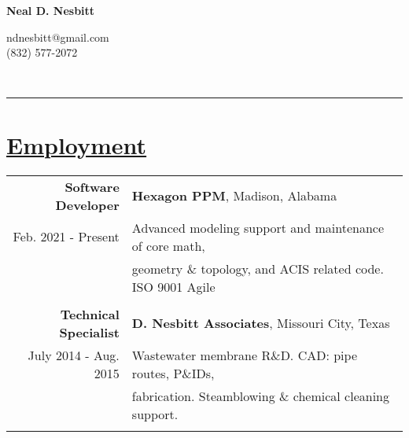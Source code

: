 \documentclass[10pt]{article}   %
\begin{document}
\noindent
\begin{minipage}[l]{0.58\textwidth}
\Huge \bf Neal D. Nesbitt
\end{minipage}
\hfill
\begin{minipage}[r]{0.38\textwidth}
\raggedleft
ndnesbitt@gmail.com\\
(832) 577-2072
\end{minipage}\\

\hrule

\section*{\underline{Employment}}

\begin{tabular}{ r | l }
\bf Software Developer		&\textbf{Hexagon PPM}, Madison, Alabama\\
Feb. 2021 - Present          		&Advanced modeling support and maintenance of core math,\\
					&geometry \& topology, and ACIS related code. ISO 9001 Agile\\
\\
\bf Technical Specialist        &\textbf{D. Nesbitt Associates}, Missouri City, Texas\\
July 2014 - Aug. 2015           &Wastewater membrane R\&D. CAD: pipe routes, P\&IDs,\\
                                &fabrication. Steamblowing \& chemical cleaning support.\\
\\

\end{tabular}
\end{document}
